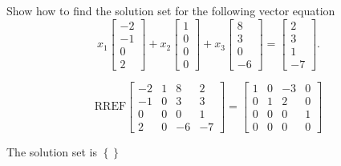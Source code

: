 
\begin{exerciseStatement}


Show how to find the solution set for the following vector equation \[ x_{1} \left[\begin{array}{c}
-2 \\
-1 \\
0 \\
2
\end{array}\right] + x_{2} \left[\begin{array}{c}
1 \\
0 \\
0 \\
0
\end{array}\right] + x_{3} \left[\begin{array}{c}
8 \\
3 \\
0 \\
-6
\end{array}\right] = \left[\begin{array}{c}
2 \\
3 \\
1 \\
-7
\end{array}\right] .\]


\end{exerciseStatement}
    
\begin{exerciseAnswer} 
\[\mathrm{RREF} \left[\begin{array}{ccc|c}
-2 & 1 & 8 & 2 \\
-1 & 0 & 3 & 3 \\
0 & 0 & 0 & 1 \\
2 & 0 & -6 & -7
\end{array}\right]  =  \left[\begin{array}{ccc|c}
1 & 0 & -3 & 0 \\
0 & 1 & 2 & 0 \\
0 & 0 & 0 & 1 \\
0 & 0 & 0 & 0
\end{array}\right] \]

The solution set is \( \left\{\right\} \)


\end{exerciseAnswer}
    
